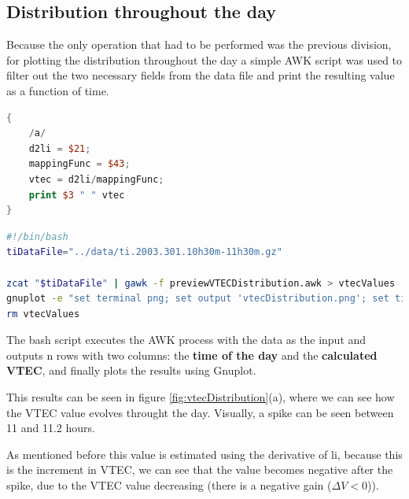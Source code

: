 \subsection{Distribution throughout the day}

Because the only operation that had to be performed was the previous division, for plotting the distribution throughout the day a simple AWK script was used to filter out the two necessary fields from the data file and print the resulting value as a function of time. 

\begin{minipage}{\linewidth}
\begin{lstlisting}[language=Awk, caption=AWK script to estimate the VTEC]
{
	/a/
	d2li = $21;
	mappingFunc = $43;
	vtec = d2li/mappingFunc;
	print $3 " " vtec
}
\end{lstlisting}
\end{minipage}

\begin{minipage}{\linewidth}
\begin{lstlisting}[language=Bash, caption=Bash script to execute the procedures]
#!/bin/bash
tiDataFile="../data/ti.2003.301.10h30m-11h30m.gz"

zcat "$tiDataFile" | gawk -f previewVTECDistribution.awk > vtecValues
gnuplot -e "set terminal png; set output 'vtecDistribution.png'; set title 'VTEC Distribution'; set xlabel 'Time of the day (hours)'; set ylabel 'VTEC'; set grid; plot \"vtecValues\" using 1:2 with point"
rm vtecValues
\end{lstlisting}
\end{minipage}
\clearpage

The bash script executes the AWK process with the data as the input and outputs n rows with two columns: the \textbf{time of the day} and the \textbf{calculated VTEC}, and finally plots the results using Gnuplot. 

This results can be seen in figure \ref{fig:vtecDistribution}(a), where we can see how the VTEC value evolves throught the day. Visually, a spike can be seen between 11 and 11.2 hours. 

As mentioned before this value is estimated using the derivative of li, because this is the increment in VTEC, we can see that the value becomes negative after the spike, due to the VTEC value decreasing (there is a negative gain ($\Delta V < 0$)).

